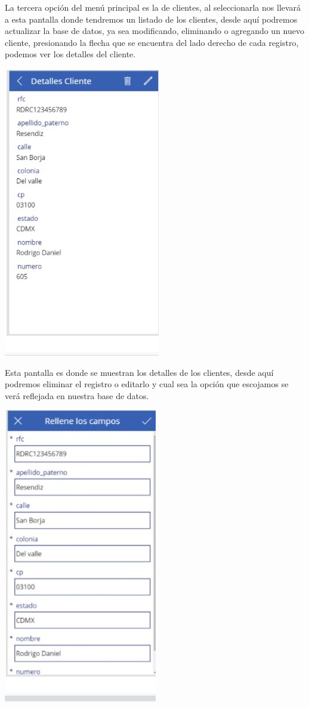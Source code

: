 \documentclass[letter,12pt]{article} %
\begin{document}
La tercera opción del menú principal es la de clientes, al seleccionarla nos llevará a esta pantalla donde tendremos un listado de los clientes, desde aquí podremos actualizar la base de datos, ya sea modificando, eliminando o agregando un nuevo cliente, presionando la flecha que se encuentra del lado derecho de cada registro, podemos ver los detalles del cliente.\\

\begin{center} 
\includegraphics[scale=0.45]{imagenes/A07.jpeg}
\end{center} 
Esta pantalla es donde se muestran los detalles de los clientes, desde aquí podremos eliminar el registro o editarlo y cual sea la opción que escojamos se verá reflejada en nuestra base de datos.\\
\begin{center} 
\includegraphics[scale=0.45]{imagenes/A08.jpeg}
\end{center}
\end{document}
